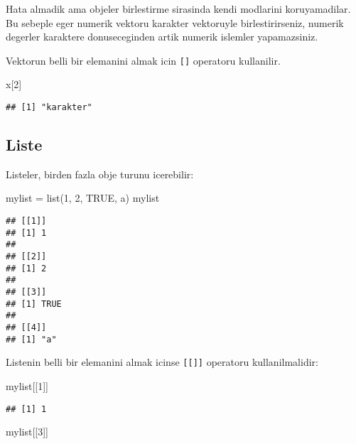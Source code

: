 \documentclass[
]{book}
\newenvironment{Shaded}{\begin{snugshade}}{\end{snugshade}}
\newcommand{\ConstantTok}[1]{\textcolor[rgb]{0.00,0.00,0.00}{#1}}
\newcommand{\DecValTok}[1]{\textcolor[rgb]{0.00,0.00,0.81}{#1}}
\newcommand{\FunctionTok}[1]{\textcolor[rgb]{0.00,0.00,0.00}{#1}}
\newcommand{\NormalTok}[1]{#1}
\newcommand{\OtherTok}[1]{\textcolor[rgb]{0.56,0.35,0.01}{#1}}
\newcommand{\StringTok}[1]{\textcolor[rgb]{0.31,0.60,0.02}{#1}}
\begin{document}
Hata almadik ama objeler birlestirme sirasinda kendi modlarini koruyamadilar. Bu sebeple eger numerik vektoru karakter vektoruyle birlestirirseniz, numerik degerler karaktere donuseceginden artik numerik islemler yapamazsiniz.

Vektorun belli bir elemanini almak icin \texttt{{[}{]}} operatoru kullanilir.

\begin{Shaded}
\begin{Highlighting}[]
\NormalTok{x[}\DecValTok{2}\NormalTok{]}
\end{Highlighting}
\end{Shaded}

\begin{verbatim}
## [1] "karakter"
\end{verbatim}

\hypertarget{liste}{%
\subsection{Liste}\label{liste}}

Listeler, birden fazla obje turunu icerebilir:

\begin{Shaded}
\begin{Highlighting}[]
\NormalTok{mylist }\OtherTok{=} \FunctionTok{list}\NormalTok{(}\DecValTok{1}\NormalTok{, }\DecValTok{2}\NormalTok{, }\ConstantTok{TRUE}\NormalTok{, }\StringTok{\textquotesingle{}a\textquotesingle{}}\NormalTok{)}
\NormalTok{mylist}
\end{Highlighting}
\end{Shaded}

\begin{verbatim}
## [[1]]
## [1] 1
## 
## [[2]]
## [1] 2
## 
## [[3]]
## [1] TRUE
## 
## [[4]]
## [1] "a"
\end{verbatim}

Listenin belli bir elemanini almak icinse \texttt{{[}{[}{]}{]}} operatoru kullanilmalidir:

\begin{Shaded}
\begin{Highlighting}[]
\NormalTok{mylist[[}\DecValTok{1}\NormalTok{]]}
\end{Highlighting}
\end{Shaded}

\begin{verbatim}
## [1] 1
\end{verbatim}

\begin{Shaded}
\begin{Highlighting}[]
\NormalTok{mylist[[}\DecValTok{3}\NormalTok{]]}
\end{Highlighting}
\end{Shaded}
\end{document}

